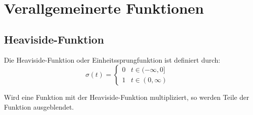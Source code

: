 \documentclass[12pt, a4paper]{scrartcl}
\begin{document}
\section{Verallgemeinerte Funktionen}

\subsection{Heaviside-Funktion}
\begin{minipage}{.5\textwidth}
  Die Heaviside-Funktion oder Einheitssprungfunktion ist definiert durch:
  \[
    \sigma (t) =
    \begin{cases}
      0 & t \in (-\infty, 0]\\
    1 & t \in (0, \infty)
  \end{cases}
\]
\end{minipage}\hfill%
\begin{minipage}{.5\textwidth}
  \centering
\end{minipage}

\begin{minipage}{.5\textwidth}
  Wird eine Funktion mit der Heaviside-Funktion multipliziert, so werden Teile der Funktion ausgeblendet.
\end{minipage}\hfill%
\begin{minipage}{.5\textwidth}
  \centering
\end{minipage}
\end{document}
